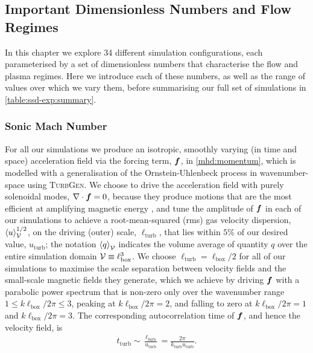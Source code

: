\subsection{Important Dimensionless Numbers and Flow Regimes}
\label{sec:ICs}

In this chapter we explore 34 different simulation configurations, each parameterised by a set of dimensionless numbers that characterise the flow and plasma regimes. Here we introduce each of these numbers, as well as the range of values over which we vary them, before summarising our full set of simulations in \autoref{table:ssd-exp:summary}.

\subsubsection{Sonic Mach Number}
\label{sec:ICs:Mach}

For all our simulations we produce an isotropic, smoothly varying (in time and space) acceleration field via the forcing term, $\bm{f}$, in \autoref{mhd:momentum}, which is modelled with a generalisation of the Ornstein-Uhlenbeck process in wavenumber-space \citep{eswaran1988examination, schmidt2006numerical, schmidt2009numerical, federrath2010comparing, Federrath2022_TurbGen} using \textsc{TurbGen}. We choose to drive the acceleration field with purely solenoidal modes, \ie $\nabla\cdot\bm{f} = 0$, because they produce motions that are the most efficient at amplifying magnetic energy \citep{federrath2011mach, federrath2014turbulent, martins2019kazantsev, chirakkara2021efficient}, and tune the amplitude of $\bm{f}$ in each of our simulations to achieve a root-mean-squared (rms) gas velocity dispersion, $\left\langle u \right\rangle_{\mathcal{V}}^{1/2}$, on the driving (outer) scale, $\ell_\mathrm{turb}$, that lies within $5\%$ of our desired value, $u_\mathrm{turb}$; the notation $\left\langle q \right\rangle_{\mathcal{V}}$ indicates the volume average of quantity $q$ over the entire simulation domain $\mathcal{V} \equiv \ell_\mathrm{box}^3$. We choose $\ell_\mathrm{turb} = \ell_\mathrm{box}/2$ for all of our simulations to maximise the scale separation between velocity fields and the small-scale magnetic fields they generate, which we achieve by driving $\bm{f}$ with a parabolic power spectrum that is non-zero only over the wavenumber range $1 \leq k \ell_\mathrm{box}/2\pi \leq 3$, peaking at $k \ell_\mathrm{box} / 2\pi = 2$, and falling to zero at $k \ell_\mathrm{box}/2\pi = 1$ and $k \ell_\mathrm{box}/2\pi = 3$. The corresponding autocorrelation time of $\bm{f}$, and hence the velocity field, is
\begin{align}
    t_\mathrm{turb}
        \sim \frac{\ell_\mathrm{turb}}{u_\mathrm{turb}}
        = \frac{2\pi}{k_\mathrm{turb} u_\mathrm{turb}} .
\end{align}


